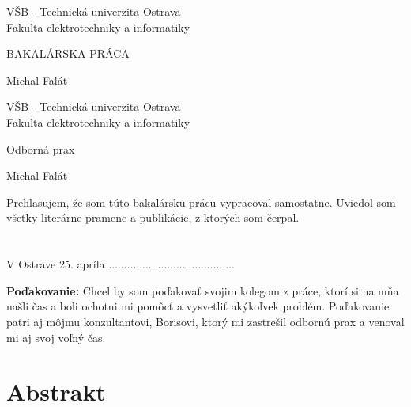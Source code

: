 \documentclass[11pt, oneside]{report}
\def\mfrok{2018}
\def\mfnazov{BAKALÁRSKA PRÁCA}
\def\mfnazovprace{Odborná prax}
\def\mfautor{Michal Falát}
\begin{document}
  


\thispagestyle{empty}

\begin{center}
\sc\large
VŠB - Technická univerzita Ostrava\\
Fakulta elektrotechniky a informatiky


\vfill

{\LARGE\mfnazov}\\
\end{center}

\vfill

{\sc\large 
\noindent \mfrok \hfill  \hfill \mfautor
}

\eject %


\thispagestyle{empty}
\noindent

\begin{center}
\sc  
\large
V\v SB - Technická univerzita Ostrava\\
Fakulta elektrotechniky a informatiky

\vfill

{\LARGE\mfnazovprace}\\
\end{center}

\vfill



{\sc\large 
\noindent \mfrok \hfill  \hfill \mfautor
}

\eject %
\setcounter{page}{3}
\newpage 
\vspace*{\fill}
Prehlasujem, že som túto bakalársku prácu vypracoval samostatne. Uviedol som všetky literárne pramene a publikácie, z ktorých som čerpal.\\\\\\
V Ostrave 25. apríla \hfill .........................................

\newpage 
\setcounter{page}{4}

\vfill
{\bf Poďakovanie:} Chcel by som poďakovať svojim kolegom  z práce, ktorí si na mňa našli čas a boli ochotni mi pomôcť a vysvetliť akýkoľvek problém. Poďakovanie patri aj môjmu konzultantovi, Borisovi, ktorý mi zastrešil odbornú prax a venoval mi aj svoj voľný čas.



\newpage 
\section*{Abstrakt}
\end{document}
